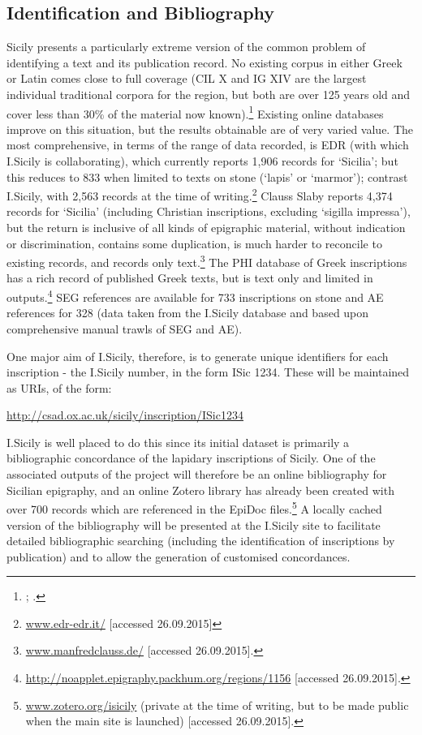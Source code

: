 \documentclass[amsthm,ebook]{saparticle}
\begin{document}
\subsection{Identification and Bibliography}


Sicily presents a particularly extreme version of the common problem of identifying a text and its publication record.
No existing corpus in either Greek or Latin comes close to full coverage (CIL X and IG XIV are the largest individual
traditional corpora for the region, but both are over 125 years old and cover less than 30\% of the material now
known).\footnote{\citet{_inscriptiones_1883}; \citet{kaibel_inscriptiones_1890}.} Existing online databases improve on this situation, but the results
obtainable are of very varied value. The most comprehensive, in terms of the range of data recorded, is EDR (with which
I.Sicily is collaborating), which currently reports 1,906 records for `Sicilia'; but this reduces to 833 when limited
to texts on stone (`lapis' or `marmor'); contrast I.Sicily, with 2,563 records at the time of writing.\footnote{
\url{www.edr-edr.it/} [accessed 26.09.2015]} Clauss Slaby reports 4,374 records for `Sicilia' (including Christian
inscriptions, excluding `sigilla impressa'), but the return is inclusive of all kinds of epigraphic material, without
indication or discrimination, contains some duplication, is much harder to reconcile to existing records, and records
only text.\footnote{ \url{www.manfredclauss.de/} [accessed 26.09.2015].} The PHI database of Greek inscriptions has a rich
record of published Greek texts, but is text only and limited in outputs.\footnote{
\url{http://noapplet.epigraphy.packhum.org/regions/1156} [accessed 26.09.2015].} SEG references are available for 733
inscriptions on stone and AE references for 328 (data taken from the I.Sicily database and based upon comprehensive
manual trawls of SEG and AE).

One major aim of I.Sicily, therefore, is to generate unique identifiers for each inscription - the I.Sicily number, in
the form ISic 1234. These will be maintained as URIs, of the form:

\url{http://csad.ox.ac.uk/sicily/inscription/ISic1234}

I.Sicily is well placed to do this since its initial dataset is primarily a bibliographic concordance of the lapidary
inscriptions of Sicily. One of the associated outputs of the project will therefore be an online bibliography for
Sicilian epigraphy, and an online Zotero library has already been created with over 700 records which are referenced in
the EpiDoc files.\footnote{\url{www.zotero.org/isicily} (private at the time of writing, but to be made public when the main
site is launched) [accessed 26.09.2015].} A locally cached version of the bibliography will be presented at the
I.Sicily site to facilitate detailed bibliographic searching (including the identification of inscriptions by
publication) and to allow the generation of customised concordances.
\end{document}
